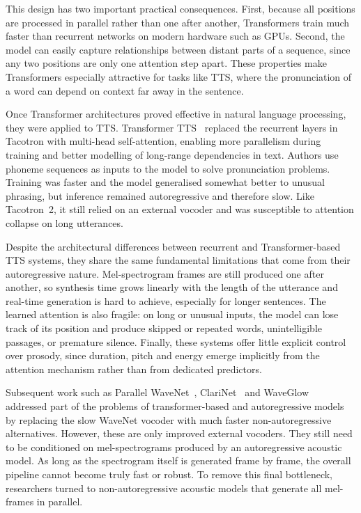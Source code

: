 \documentclass[
         english, %
    monochrome, %
]{VUMIFSEMasterThesis}
\begin{document}
This design has two important practical consequences.
First, because all positions are processed in parallel rather than one after another, Transformers train much faster than recurrent networks on modern hardware such as GPUs.
Second, the model can easily capture relationships between distant parts of a sequence, since any two positions are only one attention step apart.
These properties make Transformers especially attractive for tasks like TTS, where the pronunciation of a word can depend on context far away in the sentence.

Once Transformer architectures proved effective in natural language processing, they were applied to TTS.
Transformer TTS~\cite{li2019neural} replaced the recurrent layers in Tacotron with multi-head self-attention, enabling more parallelism during training and better modelling of long-range dependencies in text.
Authors use phoneme sequences as inputs to the model to solve pronunciation problems.
Training was faster and the model generalised somewhat better to unusual phrasing, but inference remained autoregressive and therefore slow.
Like Tacotron~2, it still relied on an external vocoder and was susceptible to attention collapse on long utterances.

Despite the architectural differences between recurrent and Transformer-based TTS systems, they share the same fundamental limitations that come from their autoregressive nature.
Mel-spectrogram frames are still produced one after another, so synthesis time grows linearly with the length of the utterance and real-time generation is hard to achieve, especially for longer sentences.
The learned attention is also fragile: on long or unusual inputs, the model can lose track of its position and produce skipped or repeated words, unintelligible passages, or premature silence.
Finally, these systems offer little explicit control over prosody, since duration, pitch and energy emerge implicitly from the attention mechanism rather than from dedicated predictors.

Subsequent work such as Parallel WaveNet~\cite{oord2018parallel}, ClariNet~\cite{ping2018clarinet} and WaveGlow~\cite{prenger2019waveglow} addressed part of the problems of transformer-based and autoregressive models by replacing the slow WaveNet vocoder with much faster non-autoregressive alternatives.
However, these are only improved external vocoders.
They still need to be conditioned on mel-spectrograms produced by an autoregressive acoustic model.
As long as the spectrogram itself is generated frame by frame, the overall pipeline cannot become truly fast or robust.
To remove this final bottleneck, researchers turned to non-autoregressive acoustic models that generate all mel-frames in parallel.
\end{document}
